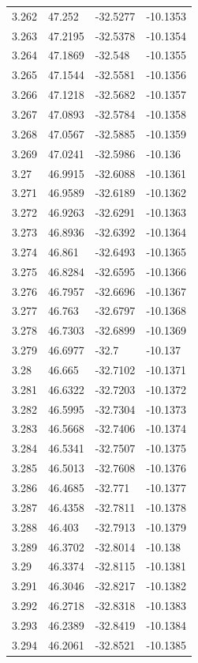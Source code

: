 \begin{tabular}{llll}
3.262 & 47.252 & -32.5277 & -10.1353 \\
3.263 & 47.2195 & -32.5378 & -10.1354 \\
3.264 & 47.1869 & -32.548 & -10.1355 \\
3.265 & 47.1544 & -32.5581 & -10.1356 \\
3.266 & 47.1218 & -32.5682 & -10.1357 \\
3.267 & 47.0893 & -32.5784 & -10.1358 \\
3.268 & 47.0567 & -32.5885 & -10.1359 \\
3.269 & 47.0241 & -32.5986 & -10.136 \\
3.27 & 46.9915 & -32.6088 & -10.1361 \\
3.271 & 46.9589 & -32.6189 & -10.1362 \\
3.272 & 46.9263 & -32.6291 & -10.1363 \\
3.273 & 46.8936 & -32.6392 & -10.1364 \\
3.274 & 46.861 & -32.6493 & -10.1365 \\
3.275 & 46.8284 & -32.6595 & -10.1366 \\
3.276 & 46.7957 & -32.6696 & -10.1367 \\
3.277 & 46.763 & -32.6797 & -10.1368 \\
3.278 & 46.7303 & -32.6899 & -10.1369 \\
3.279 & 46.6977 & -32.7 & -10.137 \\
3.28 & 46.665 & -32.7102 & -10.1371 \\
3.281 & 46.6322 & -32.7203 & -10.1372 \\
3.282 & 46.5995 & -32.7304 & -10.1373 \\
3.283 & 46.5668 & -32.7406 & -10.1374 \\
3.284 & 46.5341 & -32.7507 & -10.1375 \\
3.285 & 46.5013 & -32.7608 & -10.1376 \\
3.286 & 46.4685 & -32.771 & -10.1377 \\
3.287 & 46.4358 & -32.7811 & -10.1378 \\
3.288 & 46.403 & -32.7913 & -10.1379 \\
3.289 & 46.3702 & -32.8014 & -10.138 \\
3.29 & 46.3374 & -32.8115 & -10.1381 \\
3.291 & 46.3046 & -32.8217 & -10.1382 \\
3.292 & 46.2718 & -32.8318 & -10.1383 \\
3.293 & 46.2389 & -32.8419 & -10.1384 \\
3.294 & 46.2061 & -32.8521 & -10.1385 \\

\end{tabular}
